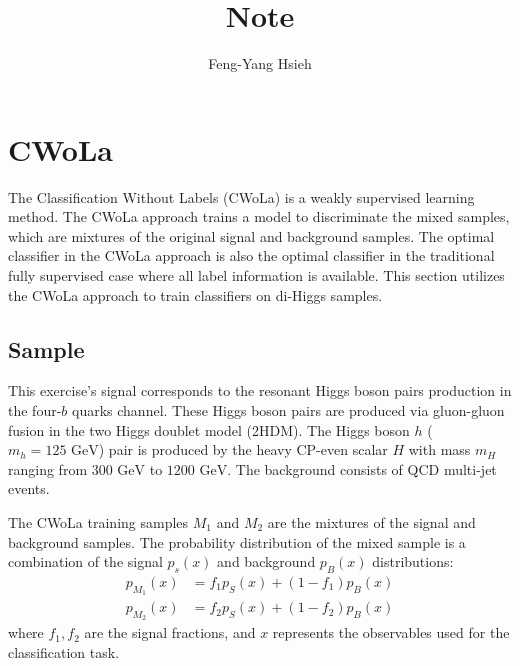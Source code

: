\documentclass[12pt]{article}
\title{Note}
\author{Feng-Yang Hsieh}
\date{}
\begin{document}
\maketitle

\section{CWoLa}%
\label{sec:cwola}
    The Classification Without Labels (CWoLa) is a weakly supervised learning method. The CWoLa approach trains a model to discriminate the mixed samples, which are mixtures of the original signal and background samples. The optimal classifier in the CWoLa approach is also the optimal classifier in the traditional fully supervised case where all label information is available. This section utilizes the CWoLa approach to train classifiers on di-Higgs samples.

    \subsection{Sample}%
    \label{sub:sample}
        This exercise's signal corresponds to the resonant Higgs boson pairs production in the four-$b$ quarks channel. These Higgs boson pairs are produced via gluon-gluon fusion in the two Higgs doublet model (2HDM). The Higgs boson $h$ ($m_h = \text{125 GeV}$) pair is produced by the heavy CP-even scalar $H$ with mass $m_H$ ranging from $\text{300 GeV}$ to $\text{1200 GeV}$. The background consists of QCD multi-jet events.

        The CWoLa training samples $M_1$ and $M_2$ are the mixtures of the signal and background samples. The probability distribution of the mixed sample is a combination of the signal $p_s(x)$ and background $p_B(x)$ distributions:
        \begin{equation}
            \begin{aligned}
                p_{M_1}(x) &=  f_1 p_S(x) + (1-f_1) p_B(x) \\
                p_{M_2}(x) &=  f_2 p_S(x) + (1-f_2) p_B(x)
            \end{aligned}
        \end{equation}
        where $f_1, f_2$ are the signal fractions, and $x$ represents the observables used for the classification task.
\end{document}

